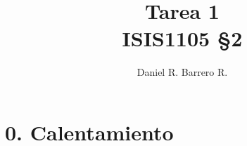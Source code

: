 \documentclass{amsart}
\title{Tarea 1 \\ ISIS1105 \S 2}
\author{Daniel R. Barrero R.}
\begin{document}
\maketitle

\section*{0. Calentamiento} 
\end{document}
